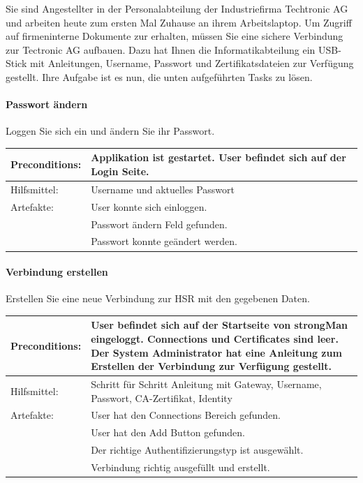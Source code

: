 Sie sind Angestellter in der Personalabteilung der Industriefirma Techtronic AG und arbeiten heute zum ersten Mal Zuhause an ihrem Arbeitslaptop. Um Zugriff auf firmeninterne Dokumente zur erhalten, müssen Sie eine sichere Verbindung zur Tectronic AG aufbauen. Dazu hat Ihnen die Informatikabteilung ein USB-Stick mit Anleitungen, Username, Passwort und Zertifikatsdateien zur Verfügung gestellt. Ihre Aufgabe ist es nun, die unten aufgeführten Tasks zu lösen.

\paragraph{Passwort ändern}
Loggen Sie sich ein und ändern Sie ihr Passwort. \\


\begin{tabular}{ | p{} | p{} | }
\hline
Preconditions: & Applikation ist gestartet. User befindet sich auf der Login Seite. \\
\hline
Hilfsmittel: & Username und aktuelles Passwort \\
\hline
Artefakte: & User konnte sich einloggen. \\ 
& Passwort ändern Feld gefunden. \\
& Passwort konnte geändert werden. \\
\hline
\end{tabular}

\paragraph{Verbindung erstellen}
Erstellen Sie eine neue Verbindung zur HSR mit den gegebenen Daten. \\


\begin{tabular}{ | p{} | p{} | }
\hline
Preconditions: & User befindet sich auf der Startseite von strongMan eingeloggt. Connections und Certificates sind leer. Der System Administrator hat eine Anleitung zum Erstellen der Verbindung zur Verfügung gestellt. \\
\hline
Hilfsmittel: & Schritt für Schritt Anleitung mit Gateway, Username, Passwort, CA-Zertifikat, Identity \\
\hline
Artefakte: & User hat den Connections Bereich gefunden. \\
& User hat den Add Button gefunden. \\
& Der richtige Authentifizierungstyp ist ausgewählt. \\
& Verbindung richtig ausgefüllt und erstellt. \\
\hline
\end{tabular}


